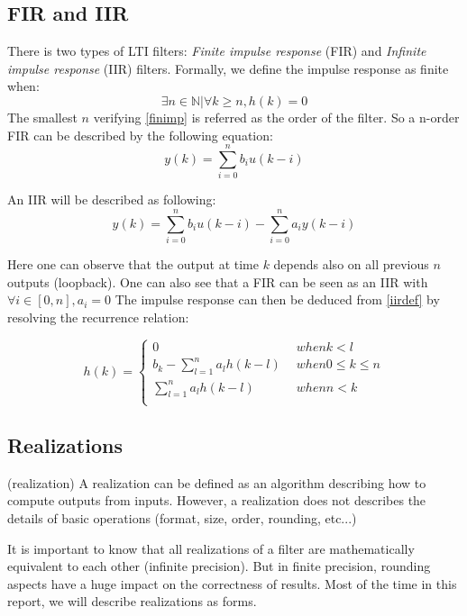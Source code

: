 	\subsection{FIR and IIR}
	There is two types of LTI filters: \textit{Finite impulse response} (FIR) and \textit{Infinite impulse response} (IIR) filters.
	Formally, we define the impulse response as finite when:
	\begin{equation} \label{finimp}
		\exists n \in \mathbb{N} | \forall k \geq n, h(k)=0
	\end{equation}
	The smallest $n$ verifying \ref{finimp} is referred as the order of the filter. So a n-order FIR can be described by the
	following equation:
	\begin{equation} \label{firdef}
		y(k)=\sum_{i=0}^n b_i u(k-i)
	\end{equation}

	An IIR will be described as following:
	\begin{equation} \label{iirdef}
		y(k)=\sum_{i=0}^n b_i u(k-i) - \sum_{i=0}^n a_i y(k-i)
	\end{equation}

	Here one can observe that the output at time $k$ depends also on all previous $n$ outputs (loopback). One can
	also see that a FIR can be seen as an IIR with $\forall i \in [0,n],a_i=0$
	The impulse response can then be deduced from \ref{iirdef} by resolving the recurrence relation:

	\begin{equation}
		h(k) =
		\begin{cases}
			0 & \hspace{5pt} when k<l\\
			b_k - \sum_{l=1}^n a_l h(k-l) & \hspace{5pt} when 0\leq k \leq n\\
			\sum_{l=1}^n a_l h(k-l) & \hspace{5pt} when n< k\\
		\end{cases}
	\end{equation}

	\subsection{Realizations}
	\begin{thdef} (realization)
	A realization can be defined as an algorithm describing how to compute outputs
	from inputs. However, a realization does not describes the details of basic operations (format, size, order,
	rounding, etc...)
	\end{thdef}
	It is important to know that all realizations of a filter are mathematically equivalent to each other (infinite
	precision). But in finite precision, rounding aspects have a huge impact on the correctness of results.
	Most of the time in this report, we will describe realizations as forms.

